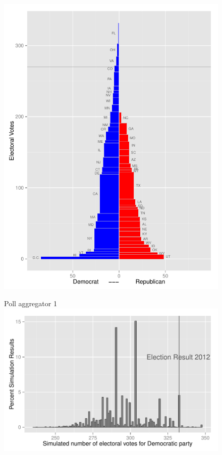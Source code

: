 \documentclass[10pt]{article}\usepackage[]{graphicx}\usepackage[]{color}
\begin{document}
\begin{figure}[hbtp] 
   \centering
   \begin{minipage}[c]{0.49\textwidth}
   \includegraphics[width=\textwidth]{tower.pdf}
   \end{minipage}
    \hfill
   \begin{minipage}[c]{0.45\textwidth}
   Poll aggregator 1 \\
      \includegraphics[width=\textwidth]{freedom-sim.pdf} 

\end{minipage}
\end{figure}
\end{document}

